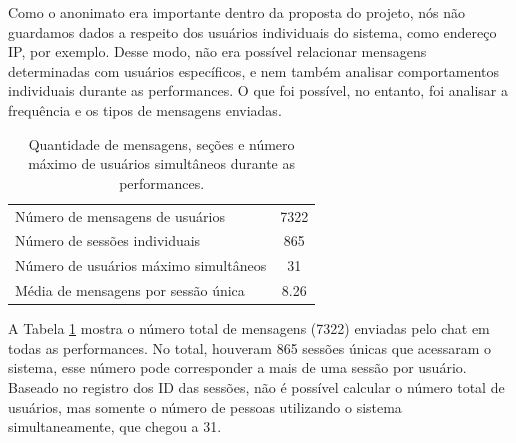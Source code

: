 
Como o anonimato era importante dentro da proposta do projeto, nós não guardamos dados a respeito dos usuários individuais do sistema, como endereço IP, por exemplo. Desse modo, não era possível relacionar mensagens determinadas com usuários específicos, e nem também analisar comportamentos individuais durante as performances. O que foi possível, no entanto, foi analisar a frequência e os tipos de mensagens enviadas.


\begin{table}[ht!]
\caption{Quantidade de mensagens, seções e número máximo de usuários simultâneos durante as performances.}{%
\begin{tabular}{@{}lc@{}}\hline
 Número de mensagens de usuários & 7322\\
 Número de sessões individuais & 865\\
 Número de usuários máximo simultâneos & 31\\
 Média de mensagens por sessão única & 8.26\\
\end{tabular}}
\label{tab:overallmsg}
\end{table}

A Tabela \ref{tab:overallmsg} mostra o número total de mensagens (7322) enviadas pelo chat em todas as performances. No total, houveram 865 sessões únicas que acessaram o sistema, esse número pode corresponder a mais de uma sessão por usuário. Baseado no registro dos ID das sessões, não é possível calcular o número total de usuários, mas somente o número de pessoas utilizando o sistema simultaneamente, que chegou a 31.

